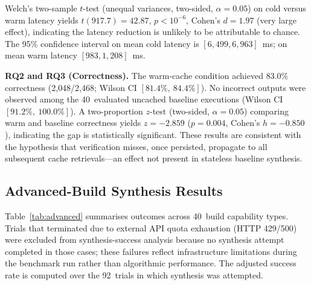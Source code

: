 \documentclass[conference]{IEEEtran}
\begin{document}
Welch's two-sample $t$-test (unequal variances, two-sided,
$\alpha = 0.05$) on cold versus warm latency yields
$t(917.7) = 42.87$, $p < 10^{-6}$, Cohen's $d = 1.97$ (very large
effect), indicating the latency reduction is unlikely to be attributable
to chance.
The 95\% confidence interval on mean cold latency is $[6{,}499,
6{,}963]$~ms; on mean warm latency $[983, 1{,}208]$~ms.

\textbf{RQ2 and RQ3 (Correctness).}
The warm-cache condition achieved 83.0\% correctness (2{,}048/2{,}468;
Wilson CI $[81.4\%,\ 84.4\%]$).
No incorrect outputs were observed among the 40~evaluated uncached baseline
executions (Wilson CI $[91.2\%,\ 100.0\%]$).
A two-proportion $z$-test (two-sided, $\alpha = 0.05$) comparing warm and
baseline correctness yields $z = -2.859$ ($p = 0.004$, Cohen's
$h = -0.850$), indicating the gap is statistically significant.
These results are consistent with the hypothesis that verification misses,
once persisted, propagate to all subsequent cache retrievals---an effect
not present in stateless baseline synthesis.

\subsection{Advanced-Build Synthesis Results}

Table~\ref{tab:advanced} summarises outcomes across 40~build capability
types.
Trials that terminated due to external API quota exhaustion (HTTP 429/500)
were excluded from synthesis-success analysis because no synthesis attempt
completed in those cases; these failures reflect infrastructure
limitations during the benchmark run rather than algorithmic performance.
The adjusted success rate is computed over the 92~trials in which
synthesis was attempted.
\end{document}
